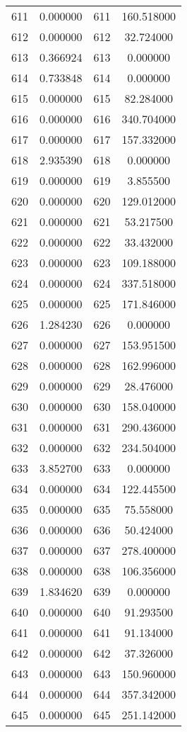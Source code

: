 \documentclass[12pt]{article}
\begin{document}
\begin{longtable}{@{}cccc@{}}
611 & 0.000000 & 611 & 160.518000 \\
612 & 0.000000 & 612 & 32.724000 \\
613 & 0.366924 & 613 & 0.000000 \\
614 & 0.733848 & 614 & 0.000000 \\
615 & 0.000000 & 615 & 82.284000 \\
616 & 0.000000 & 616 & 340.704000 \\
617 & 0.000000 & 617 & 157.332000 \\
618 & 2.935390 & 618 & 0.000000 \\
619 & 0.000000 & 619 & 3.855500 \\
620 & 0.000000 & 620 & 129.012000 \\
621 & 0.000000 & 621 & 53.217500 \\
622 & 0.000000 & 622 & 33.432000 \\
623 & 0.000000 & 623 & 109.188000 \\
624 & 0.000000 & 624 & 337.518000 \\
625 & 0.000000 & 625 & 171.846000 \\
626 & 1.284230 & 626 & 0.000000 \\
627 & 0.000000 & 627 & 153.951500 \\
628 & 0.000000 & 628 & 162.996000 \\
629 & 0.000000 & 629 & 28.476000 \\
630 & 0.000000 & 630 & 158.040000 \\
631 & 0.000000 & 631 & 290.436000 \\
632 & 0.000000 & 632 & 234.504000 \\
633 & 3.852700 & 633 & 0.000000 \\
634 & 0.000000 & 634 & 122.445500 \\
635 & 0.000000 & 635 & 75.558000 \\
636 & 0.000000 & 636 & 50.424000 \\
637 & 0.000000 & 637 & 278.400000 \\
638 & 0.000000 & 638 & 106.356000 \\
639 & 1.834620 & 639 & 0.000000 \\
640 & 0.000000 & 640 & 91.293500 \\
641 & 0.000000 & 641 & 91.134000 \\
642 & 0.000000 & 642 & 37.326000 \\
643 & 0.000000 & 643 & 150.960000 \\
644 & 0.000000 & 644 & 357.342000 \\
645 & 0.000000 & 645 & 251.142000 \\

\end{longtable}
\end{document}
